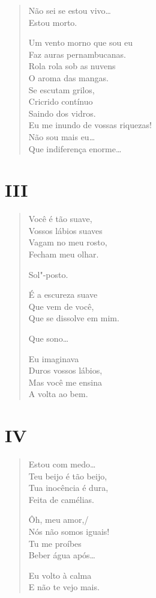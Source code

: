 \begin{verse}
Não sei se estou vivo\ldots{}\\
Estou morto.

Um vento morno que sou eu\\
Faz auras pernambucanas.\\
Rola rola sob as nuvens\\
O aroma das mangas.\\
Se escutam grilos,\\
Cricrido contínuo\\
Saindo dos vidros.\\
Eu me inundo de vossas riquezas!\\
Não sou mais eu\ldots{}\\

Que indiferença enorme\ldots{}
\end{verse}

\pagebreak
\section*{III}

\begin{verse}
Você é tão suave,\\
Vossos lábios suaves\\
Vagam no meu rosto,\\
Fecham meu olhar.

Sol"-posto.

É a escureza suave\\
Que vem de você,\\
Que se dissolve em mim.

Que sono\ldots{}

Eu imaginava\\
Duros vossos lábios,\\
Mas você me ensina\\
A volta ao bem.
\end{verse}

\pagebreak
\section*{IV}

\begin{verse}
Estou com medo\ldots{}\\
Teu beijo é tão beijo,\\
Tua inocência é dura,\\
Feita de camélias.

Ôh, meu amor,/\\
Nós não somos iguais!\\
Tu me proíbes\\
Beber água após\ldots{}

Eu volto à calma\\
E não te vejo mais.
\end{verse}

